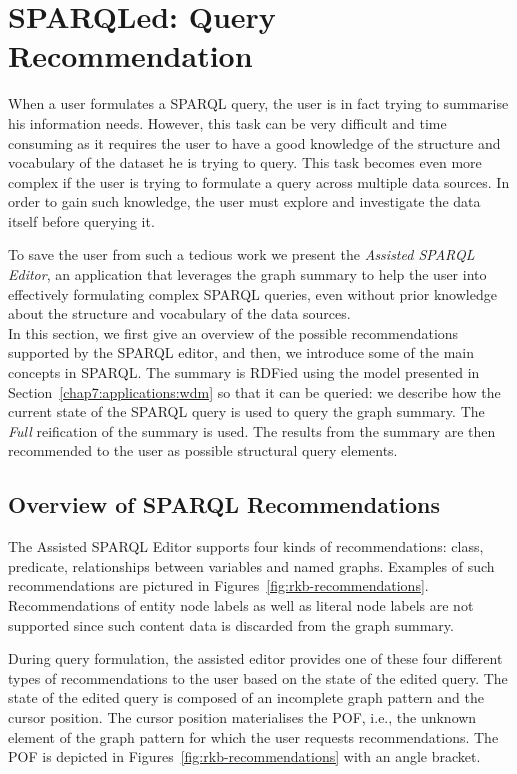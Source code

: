 \section{SPARQLed: Query Recommendation}
\label{chap7:applications:sparqled:recommendation}

When a user formulates a SPARQL query, the user is in fact trying to summarise his information needs. However, this task can be very difficult and time consuming as it requires the user to have a good knowledge of the structure and vocabulary of the dataset he is trying to query. This task becomes even more complex if the user is trying to formulate a query across multiple data sources. In order to gain such knowledge, the user must explore and investigate the data itself before querying it.

To save the user from such a tedious work we present the \emph{Assisted SPARQL Editor}, an application that leverages the graph summary to help the user into effectively formulating complex SPARQL queries, even without prior knowledge about the structure and vocabulary of the data sources.\\

In this section, we first give an overview of the possible recommendations supported by the SPARQL editor, and then, we introduce some of the main concepts in SPARQL. The summary is RDFied using the model presented in Section~\ref{chap7:applications:wdm} so that it can be queried: we describe how the current state of the SPARQL query is used to query the graph summary. The \emph{Full} reification of the summary is used. The results from the summary are then recommended to the user as possible structural query elements.

\subsection{Overview of SPARQL Recommendations}

The Assisted SPARQL Editor supports four kinds of recommendations: class, predicate, relationships between variables and named graphs. Examples of such recommendations are pictured in Figures~\ref{fig:rkb-recommendations}. Recommendations of entity node labels as well as literal node labels are not supported since such content data is discarded from the graph summary.

During query formulation, the assisted editor provides one of these four different types of recommendations to the user based on the state of the edited query. The state of the edited query is composed of an incomplete graph pattern and the cursor position. The cursor position materialises the \gls{POF}, i.e., the unknown element of the graph pattern for which the user requests recommendations. The \gls{POF} is depicted in Figures~\ref{fig:rkb-recommendations} with an angle bracket.

